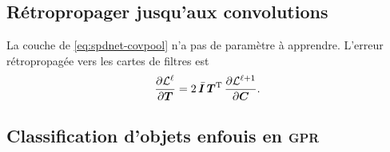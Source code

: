 
\subsection{Rétropropager jusqu'aux convolutions}
\label{sec:spdnet-covpool-backprop}

\begin{proposition}
\label{prop:spdnet-covpool-grad}
  La couche \CovPool{} de \cref{eq:spdnet-covpool} n'a pas de paramètre à
  apprendre. L'erreur rétropropagée vers les cartes de filtres est
  \begin{equation}
    \frac{\partial \mathcal{L}^{\ell}}{\partial \boldsymbol{T}}
    =
    2\,\bar{\boldsymbol{I}}\,\boldsymbol{T}^{\mathrm{T}}\,\frac{\partial \mathcal{L}^{\ell+1}}{\partial \boldsymbol{C}}.
    \label{eq:spdnet-covpool-grad}
  \end{equation}
\end{proposition}


\subsection{Classification d'objets enfouis en \textsc{gpr}}
\label{sec:spdnet-covpool-resultats}

